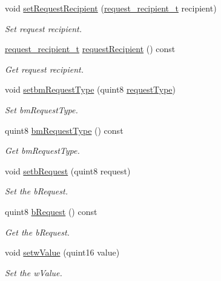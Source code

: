 \begin{DoxyCompactItemize}
void \hyperlink{classmdt_frame_usb_control_a0cf8142890953b507ec2f6ae2003d137}{set\-Request\-Recipient} (\hyperlink{classmdt_frame_usb_control_aaf1f08b1b5e47ab18426800ed0accbde}{request\-\_\-recipient\-\_\-t} recipient)
\begin{DoxyCompactList}\small\item\em Set request recipient. \end{DoxyCompactList}\item 
\hyperlink{classmdt_frame_usb_control_aaf1f08b1b5e47ab18426800ed0accbde}{request\-\_\-recipient\-\_\-t} \hyperlink{classmdt_frame_usb_control_aeb7b5844c0a025ff6692b3724a21a2a4}{request\-Recipient} () const 
\begin{DoxyCompactList}\small\item\em Get request recipient. \end{DoxyCompactList}\item 
void \hyperlink{classmdt_frame_usb_control_a62121aef1ceb3dd04c78c2fe91b86a4f}{setbm\-Request\-Type} (quint8 \hyperlink{classmdt_frame_usb_control_a6af55e02c1f80cda83876825f151a28c}{request\-Type})
\begin{DoxyCompactList}\small\item\em Set bm\-Request\-Type. \end{DoxyCompactList}\item 
quint8 \hyperlink{classmdt_frame_usb_control_a760f73ebe2d8cefc1d70c4d22f84fac3}{bm\-Request\-Type} () const 
\begin{DoxyCompactList}\small\item\em Get bm\-Request\-Type. \end{DoxyCompactList}\item 
void \hyperlink{classmdt_frame_usb_control_a308340318fd79b4d34d887a026e6e652}{setb\-Request} (quint8 request)
\begin{DoxyCompactList}\small\item\em Set the b\-Request. \end{DoxyCompactList}\item 
quint8 \hyperlink{classmdt_frame_usb_control_ab4c57d23805b5ef21a571d200109b403}{b\-Request} () const 
\begin{DoxyCompactList}\small\item\em Get the b\-Request. \end{DoxyCompactList}\item 
void \hyperlink{classmdt_frame_usb_control_a9200179b1a6ac8edf75897f5dfcd4ed4}{setw\-Value} (quint16 value)
\begin{DoxyCompactList}\small\item\em Set the w\-Value. \end{DoxyCompactList}\item 

\end{DoxyCompactItemize}
